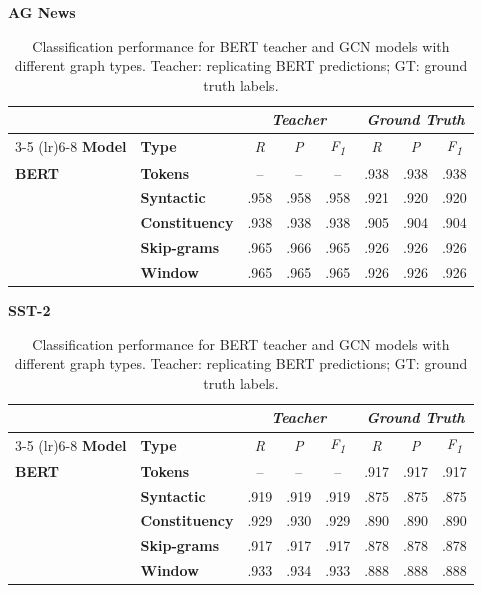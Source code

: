 \documentclass[preprint, times, review, 10pt]{elsarticle}
\begin{document}
\begin{table}[H]
\centering
\caption{Classification performance for BERT teacher and GCN models with different graph types. Teacher: replicating BERT predictions; GT: ground truth labels.}
\label{tab:performance_comparison}
\tiny
\begin{minipage}[t]{.48\linewidth}
\centering
\textbf{AG News}
\vspace{0.2em}

\begin{tabular}{@{}llcccccc@{}}
\toprule
& & \multicolumn{3}{c}{\textit{\textbf{Teacher}}} & \multicolumn{3}{c}{\textit{\textbf{Ground Truth}}} \\
\cmidrule(lr){3-5} \cmidrule(lr){6-8}
\textbf{Model} & \textbf{Type} & \textit{R} & \textit{P} & \textit{F\textsubscript{1}} & \textit{R} & \textit{P} & \textit{F\textsubscript{1}} \\
\midrule
\textbf{BERT} & \textbf{Tokens} & -- & -- & -- & .938 & .938 & .938 \\
\addlinespace[0.2em]
\multirow{4}{*}{\textbf{GCN}} 
 & \textbf{Syntactic}    & .958 & .958 & .958 & .921 & .920 & .920 \\
 & \textbf{Constituency} & .938 & .938 & .938 & .905 & .904 & .904 \\
 & \textbf{Skip-grams}   & .965 & .966 & .965 & .926 & .926 & .926 \\
 & \textbf{Window}       & .965 & .965 & .965 & .926 & .926 & .926 \\
\bottomrule
\end{tabular}
\end{minipage}%
\hfill
\begin{minipage}[t]{.48\linewidth}
\centering
\textbf{SST-2}
\vspace{0.2em}

\begin{tabular}{@{}llcccccc@{}}
\toprule
& & \multicolumn{3}{c}{\textit{\textbf{Teacher}}} & \multicolumn{3}{c}{\textit{\textbf{Ground Truth}}} \\
\cmidrule(lr){3-5} \cmidrule(lr){6-8}
\textbf{Model} & \textbf{Type} & \textit{R} & \textit{P} & \textit{F\textsubscript{1}} & \textit{R} & \textit{P} & \textit{F\textsubscript{1}} \\
\midrule
\textbf{BERT} & \textbf{Tokens} & -- & -- & -- & .917 & .917 & .917 \\
\addlinespace[0.2em]
\multirow{4}{*}{\textbf{GCN}} 
 & \textbf{Syntactic}    & .919 & .919 & .919 & .875 & .875 & .875 \\
 & \textbf{Constituency} & .929 & .930 & .929 & .890 & .890 & .890 \\
 & \textbf{Skip-grams}   & .917 & .917 & .917 & .878 & .878 & .878 \\
 & \textbf{Window}       & .933 & .934 & .933 & .888 & .888 & .888 \\
\bottomrule
\end{tabular}
\end{minipage}
\end{table}
\end{document}
